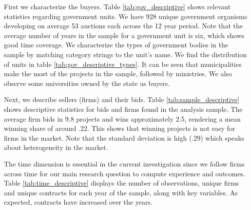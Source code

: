 First we characterize the buyers. Table \ref{tab:gov_descriptive} shows relevant statistics regarding government units. We have 928 unique government organisms developing on average 53 auctions each across the 12 year period. Note that the average number of years in the sample for a government unit is six, which shows good time coverage. We characterize the types of government bodies in the sample by matching category strings to the unit's name. We find the distribution of units in table \ref{tab:gov_descriptive_types}. It can be seen that municipalities make the most of the projects in the sample, followed by ministries. We also observe some universities owned by the state as buyers.




Next, we describe sellers (firms) and their bids. Table \ref{tab:sample_descriptive} shows descriptive statistics for bids and firms found in the analysis sample. The average firm bids in 9.8 projects and wins approximately 2.5, rendering a mean winning share of around .22. This shows that winning projects is not easy for firms in the market. Note that the standard deviation is high (.29) which speaks about heterogeneity in the market.



The time dimension is essential in the current investigation since we follow firms across time for our main research question to compute experience and outcomes. Table \ref{tab:time_descriptive} displays the number of observations, unique firms and unique contracts for each year of the sample, along with key variables. As expected, contracts have increased over the years.




